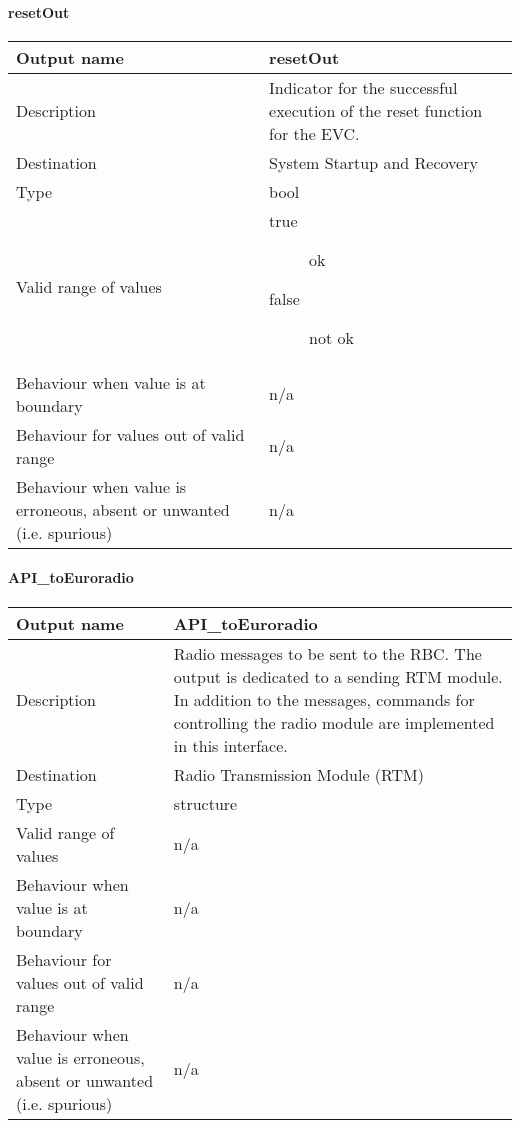 \paragraph{resetOut}

\begin{longtable}{p{}p{}}
\toprule
Output name				& resetOut \\
\midrule
Description				& Indicator for the successful execution of the reset function for the EVC. \\
\midrule
Destination				& System Startup and Recovery \\ 
\midrule
Type					& bool \\
\midrule
Valid range of values	& 
\begin{description}
\item[true] ok
\item[false] not ok 
\end{description}\\
\midrule
Behaviour when value is at boundary	& n/a \\
\midrule
Behaviour for values out of valid range	& n/a \\
\midrule
Behaviour when value is erroneous, absent or unwanted (i.e. spurious) & n/a \\
\bottomrule
\end{longtable}


\paragraph{API\_toEuroradio}

\begin{longtable}{p{}p{}}
\toprule
Output name				& API\_toEuroradio \\
\midrule
Description				& Radio messages to be sent to the RBC. The output is dedicated to a sending RTM module. In addition to the messages, commands for controlling the radio module are implemented in this interface.  \\
\midrule
Destination				& Radio Transmission Module (RTM) \\ 
\midrule
Type					& structure \\
\midrule
Valid range of values	& n/a \\
\midrule
Behaviour when value is at boundary	& n/a \\
\midrule
Behaviour for values out of valid range	& n/a \\
\midrule
Behaviour when value is erroneous, absent or unwanted (i.e. spurious) & n/a \\
\bottomrule
\end{longtable}


